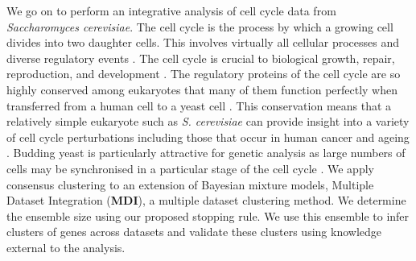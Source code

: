 \documentclass[12pt]{article}
\begin{document}
We go on to perform an integrative analysis of cell cycle data from \emph{Saccharomyces cerevisiae}. The cell cycle is the process by which a growing cell divides into two daughter cells. This involves virtually all cellular processes 
and diverse regulatory events \citep{granovskaia2010high}. The cell cycle is crucial to biological growth, repair, reproduction, and development
\citep{tyson2013cell, chen2004integrative, alberts2018molecular}. The regulatory proteins of the 
cell cycle are so highly conserved among eukaryotes that many of them function perfectly when transferred from a human cell to a yeast cell \citep{alberts2018molecular}. This conservation means that a relatively simple eukaryote such as \emph{S. cerevisiae} can provide insight into a variety of cell cycle perturbations including those that occur in human cancer \citep{ingalls2007systems, chen2004integrative} and ageing \citep{jimenez2015live}. Budding yeast is particularly attractive for genetic analysis as
large numbers of cells may be synchronised in a particular stage of the cell cycle  \citep{juanes2017methods}. We apply consensus clustering to an extension of Bayesian mixture models, Multiple Dataset Integration (\textbf{MDI}), a multiple dataset clustering method. 
We determine the ensemble size using our proposed stopping rule. We use this ensemble to infer clusters of genes across datasets and validate these clusters using knowledge external to the analysis. 

\end{document}

